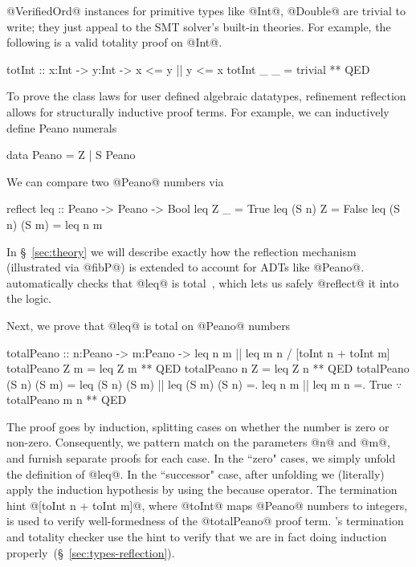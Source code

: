 


@VerifiedOrd@ instances for primitive types like @Int@, @Double@ are trivial to
write; they just appeal to the SMT solver's built-in theories.
%
For example, the following is a valid totality proof on @Int@.
\begin{code}
  totInt :: x:Int -> y:Int -> {x <= y || y <= x}
  totInt _ _ = trivial ** QED
\end{code}

%
To prove the class laws for user defined algebraic datatypes,
refinement reflection allows for structurally inductive proof terms.
%
For example, we can inductively define Peano numerals
%
\begin{code}
  data Peano = Z | S Peano
\end{code}
%
We can compare two @Peano@ numbers via
\begin{code}
  reflect leq :: Peano -> Peano -> Bool
  leq Z _         = True
  leq (S n) Z     = False
  leq (S n) (S m) = leq n m
\end{code}
%
In \S~\ref{sec:theory} we will describe
exactly how the reflection mechanism (illustrated
via @fibP@) is extended to account for ADTs like @Peano@.
%
\toolname automatically checks
that @leq@ is total~\citep{Vazou14}, which
lets us safely @reflect@ it into the logic.

Next, we prove that @leq@ is total on @Peano@ numbers
%
\begin{mcode}
  totalPeano :: n:Peano -> m:Peano -> {leq n m || leq m n}
             /  [toInt n + toInt m]
  totalPeano Z m = leq Z m ** QED
  totalPeano n Z = leq Z n ** QED
  totalPeano (S n) (S m)
   =  leq (S n) (S m) || leq (S m) (S n)
   =. leq n m || leq m n
   =. True $\because$ totalPeano m n
   ** QED
\end{mcode}
The proof goes by induction, splitting cases on
whether the number is zero or non-zero. Consequently,
we pattern match on the parameters @n@ and @m@, and furnish
separate proofs for each case.
%
In the ``zero" cases, we simply unfold the definition
of @leq@.
%
In the ``successor" case, after unfolding we (literally)
apply the induction hypothesis by using the because operator.
%
The termination hint @[toInt n + toInt m]@,
where @toInt@ maps @Peano@ numbers to integers,
is used to verify well-formedness of the @totalPeano@
proof term.
%
\toolname's termination and totality checker
use the hint to
verify that we are in fact doing induction
properly~(\S~\ref{sec:types-reflection}).

